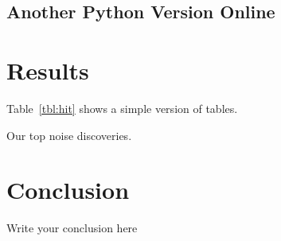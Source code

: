 \documentclass[11pt]{article}
\begin{document}
\subsection{Another Python Version Online}

\section{Results}

Table~\ref{tbl:hit} shows a simple version of tables.

\begin{table}
  \centering
  
  \caption{Our top noise discoveries.}
  \label{tbl:hit}
\end{table}





\section{Conclusion}

Write your conclusion here
\end{document}
